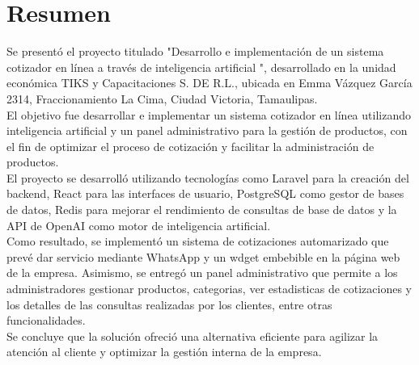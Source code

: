 \documentclass[12pt]{article}
\newcommand{\NombreProyecto}{Desarrollo e implementación de un sistema cotizador en línea a través de inteligencia artificial }
\newcommand{\UnidadEconomica}{TIKS y Capacitaciones S. DE R.L.}
\newcommand{\nasesorinstitucional}{Dr. Said Polanco Martagón}
\begin{document}





\clearpage
\ClearWallPaper
\thispagestyle{fancy}

\section*{Resumen}

Se presentó el proyecto titulado "\NombreProyecto", desarrollado en la unidad económica \UnidadEconomica, ubicada en Emma Vázquez García 2314, Fraccionamiento La Cima, Ciudad Victoria, Tamaulipas.\\
El objetivo fue desarrollar e implementar un sistema cotizador en línea utilizando inteligencia artificial y un panel administrativo para la gestión de productos, con el fin de optimizar el proceso de cotización y facilitar la administración de productos.\\
El proyecto se desarrolló utilizando tecnologías como Laravel para la creación del backend, React para las interfaces de usuario, PostgreSQL como gestor de bases de datos, Redis para mejorar el rendimiento de consultas de base de datos y la API de OpenAI como motor de inteligencia artificial.\\
Como resultado, se implementó un sistema de cotizaciones automarizado que prevé dar servicio mediante WhatsApp y un wdget embebible en la página web de la empresa. Asimismo, se entregó un panel administrativo que permite a los administradores gestionar productos, categorias, ver estadisticas de cotizaciones y los detalles de las consultas realizadas por los clientes, entre otras funcionalidades.\\
Se concluye que la solución ofreció una alternativa eficiente para agilizar la atención al cliente y optimizar la gestión interna de la empresa.

\end{document}
